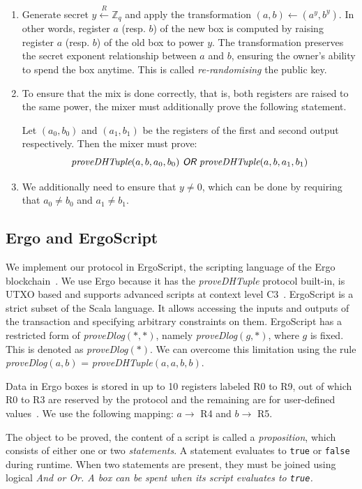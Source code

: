 \documentclass[runningheads]{llncs}
\newcommand{\rand}{\stackrel{R}{\leftarrow}}
\begin{document}
\begin{enumerate}
\item Generate secret $y \rand \mathbb{Z}_q$ and apply the transformation $(a, b) \leftarrow (a ^y, b ^y)$. In other words, register $a$ (resp. $b$) of the new box is computed by raising register $a$ (resp. $b$) of the old box to power $y$. The transformation preserves the secret exponent relationship between $a$ and $b$, ensuring the owner's ability to spend the box anytime. This is called {\em re-randomising} the public key.
\item To ensure that the mix is done correctly, that is, both registers are raised to the same power, the mixer must additionally prove the following statement.

Let $(a_0, b_0)$ and $(a_1, b_1)$ be the registers of the first and second output respectively. Then the mixer must prove:
$$\text{\em proveDHTuple$(a, b, a_0, b_0)\textsf{ OR }$proveDHTuple$(a, b, a_1, b_1)$}$$

\item We additionally need to ensure that $y \neq 0$, which can be done by requiring that $a_0 \neq b_0$ and $a_1 \neq b_1$.

\end{enumerate}

\subsection{Ergo and ErgoScript}

We implement our protocol in ErgoScript, the scripting language of the Ergo blockchain~\cite{ergo,tutorial}. We use Ergo because it has the {\em proveDHTuple} protocol built-in, is UTXO based and supports advanced scripts at context level C3~\cite{bypassing}. ErgoScript is a strict subset of the Scala language. It allows accessing the inputs and outputs of the transaction and specifying arbitrary constraints on them.
ErgoScript has a restricted form of {\em proveDlog$(*, *)$}, namely {\em proveDlog$(g, *)$}, where $g$ is fixed.
This is denoted as {\em proveDlog$(*)$}. We can overcome this limitation using the rule {\em proveDlog$(a, b)$} = {\em proveDHTuple$(a, a, b, b)$}.

Data in Ergo boxes is stored in up to 10 registers labeled R0 to R9, out of which R0 to R3 are reserved by the protocol and the remaining are for user-defined values~\cite{tutorial}. We use the following mapping: $a \rightarrow$ R4 and $b \rightarrow$ R5.

The object to be proved, the content of a script is called a {\em proposition}, which consists of either one or two {\em statements}. A statement evaluates to \texttt{true} or \texttt{false} during
runtime. When two statements are present, they must be joined using logical \em{And} or \em{Or}. A box can be spent when its script evaluates to \texttt{true}.
\end{document}
